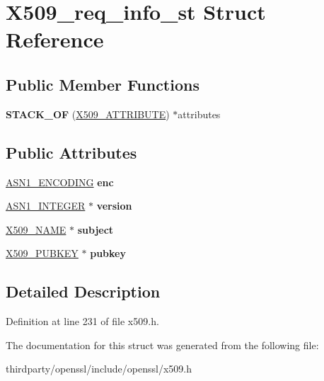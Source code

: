 \hypertarget{struct_x509__req__info__st}{}\section{X509\+\_\+req\+\_\+info\+\_\+st Struct Reference}
\label{struct_x509__req__info__st}
\subsection*{Public Member Functions}
\begin{DoxyCompactItemize}
\item 
\mbox{\label{struct_x509__req__info__st_a86e128a024c2c3d5e80a59514c8b3187}} 
{\bfseries S\+T\+A\+C\+K\+\_\+\+OF} (\hyperlink{structx509__attributes__st}{X509\+\_\+\+A\+T\+T\+R\+I\+B\+U\+TE}) $\ast$attributes
\end{DoxyCompactItemize}
\subsection*{Public Attributes}
\begin{DoxyCompactItemize}
\item 
\mbox{\label{struct_x509__req__info__st_a7db85d33e14e55ab747c4c28ed259ba5}} 
\hyperlink{struct_a_s_n1___e_n_c_o_d_i_n_g__st}{A\+S\+N1\+\_\+\+E\+N\+C\+O\+D\+I\+NG} {\bfseries enc}
\item 
\mbox{\label{struct_x509__req__info__st_a3f5f148e75b34d4cdce959b0a744d7db}} 
\hyperlink{structasn1__string__st}{A\+S\+N1\+\_\+\+I\+N\+T\+E\+G\+ER} $\ast$ {\bfseries version}
\item 
\mbox{\label{struct_x509__req__info__st_a58cdac102c16aadc3617e2f430b966c2}} 
\hyperlink{struct_x509__name__st}{X509\+\_\+\+N\+A\+ME} $\ast$ {\bfseries subject}
\item 
\mbox{\label{struct_x509__req__info__st_a6aa13ec7edfacffb598f1c024c28ad46}} 
\hyperlink{struct_x509__pubkey__st}{X509\+\_\+\+P\+U\+B\+K\+EY} $\ast$ {\bfseries pubkey}
\end{DoxyCompactItemize}


\subsection{Detailed Description}


Definition at line 231 of file x509.\+h.



The documentation for this struct was generated from the following file\+:\begin{DoxyCompactItemize}
\item 
thirdparty/openssl/include/openssl/x509.\+h\end{DoxyCompactItemize}

